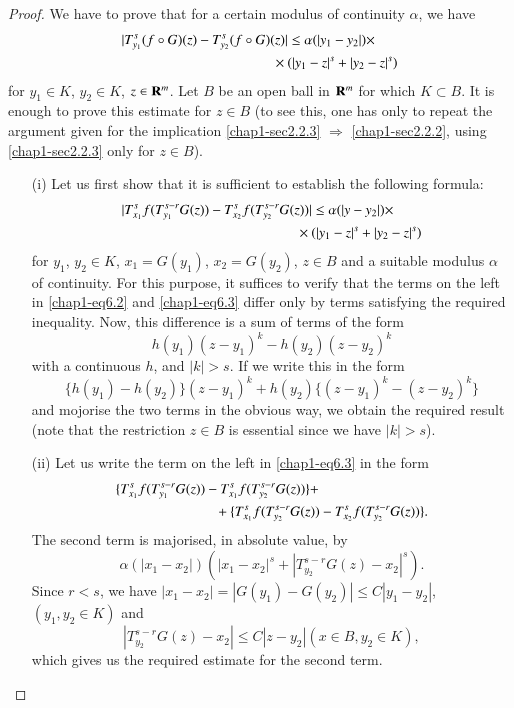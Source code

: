 \begin{proof}
We have to prove that for a certain modulus of continuity $\alpha$, we have
\setcounter{equation}{1}
\begin{align}
& |T^{s}_{y_{1}}(f\circ G)(z)-T^{s}_{y_{2}}(f\circ G)(z)|\leq \alpha (|y_{1}-y_{2}|)\times\notag\\
&\hspace{3.8cm} \times (|y_{1}-z|^{s}+|y_{2}-z|^{s})\label{chap1-eq6.2}
\end{align}
for $y_{1}\in K$, $y_{2}\in K$, $z\in \mathbf{R}^{m}$. Let $B$ be an open ball in $\mathbf{R}^{m}$ for which $K\subset B$. It is enough to prove this estimate for $z\in B$ (to see this, one has only to repeat the argument given for the implication \eqref{chap1-sec2.2.3} $\Rightarrow$ \eqref{chap1-sec2.2.2}, using \eqref{chap1-sec2.2.3} only for $z\in B$).
\begin{itemize}
\item[(i)] Let us first show that it is sufficient to establish the following formula:
\begin{align}
& |T^{s}_{x_{1}}f(T^{s-r}_{y_{1}}G(z))-T^{s}_{x_{2}}f(T^{s-r}_{y_{2}}G(z))|\leq \alpha(|y-y_{2}|)\times\notag\\
&\hspace{4.4cm} \times (|y_{1}-z|^{s}+|y_{2}-z|^{s})\label{chap1-eq6.3}
\end{align}
for $y_{1}$, $y_{2}\in K$, $x_{1}=G(y_{1})$, $x_{2}=G(y_{2})$, $z\in B$ and a suitable modulus $\alpha$ of continuity. For this purpose, it suffices to verify that the terms on the left in \eqref{chap1-eq6.2} and \eqref{chap1-eq6.3} differ only by terms satisfying the required inequality. Now, this difference is a sum of terms of the form
$$
h(y_{1})(z-y_{1})^{k}-h(y_{2})(z-y_{2})^{k}
$$
with a continuous $h$, and $|k|>s$. If we write this in the form
$$
\{h(y_{1})-h(y_{2})\}(z-y_{1})^{k}+h(y_{2})\{(z-y_{1})^{k}-(z-y_{2})^{k}\}
$$\pageoriginale
and mojorise the two terms in the obvious way, we obtain the required result (note that the restriction $z\in B$ is essential since we have $|k|>s$).

\item[(ii)] Let us write the term on the left in \eqref{chap1-eq6.3} in the form
\begin{align}
& \{T^{s}_{x_{1}}f(T^{s-r}_{y_{1}}G(z))-T^{s}_{x_{1}}f(T^{s-r}_{y_{2}}G(z))\}+\notag\\
& \hspace{2.5cm} +\{T^{s}_{x_{1}}f(T^{s-r}_{y_{2}}G(z))-T^{s}_{x_{2}}f(T^{s-r}_{y_{2}}G(z))\}.\label{chap1-eq6.4}
\end{align}
The second term is majorised, in absolute value, by
$$
\alpha (|x_{1}-x_{2}|)(|x_{1}-x_{2}|^{s}+|T^{s-r}_{y_{2}}G(z)-x_{2}|^{s}).
$$
Since $r<s$, we have $|x_{1}-x_{2}|=|G(y_{1})-G(y_{2})|\leq C|y_{1}-y_{2}|$, $(y_{1},y_{2}\in K)$ and 
\begin{equation}
|T^{s-r}_{y_{2}}G(z)-x_{2}|\leq C|z-y_{2}|(x\in B, y_{2}\in K),\label{chap1-eq6.5}
\end{equation}
which gives us the required estimate for the second term.


\end{itemize}
\end{proof}
